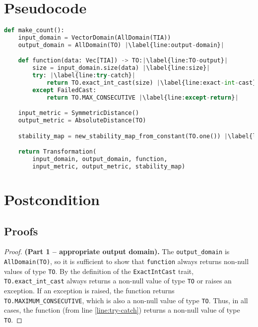 \documentclass{article}
\begin{document}
\section{Pseudocode}
\begin{lstlisting}[language = Python, escapechar=|]
def make_count():
    input_domain = VectorDomain(AllDomain(TIA))
    output_domain = AllDomain(TO) |\label{line:output-domain}|

    def function(data: Vec[TIA]) -> TO:|\label{line:TO-output}|
        size = input_domain.size(data) |\label{line:size}|
        try: |\label{line:try-catch}|
            return TO.exact_int_cast(size) |\label{line:exact-int-cast}|
        except FailedCast:
            return TO.MAX_CONSECUTIVE |\label{line:except-return}|

    input_metric = SymmetricDistance()
    output_metric = AbsoluteDistance(TO)

    stability_map = new_stability_map_from_constant(TO.one()) |\label{line:stability-map}|

    return Transformation(
        input_domain, output_domain, function,
        input_metric, output_metric, stability_map)
\end{lstlisting}

\section{Postcondition}

\subsection*{Proofs}

\begin{proof} \textbf{(Part 1 -- appropriate output domain).}
    The \texttt{output\_domain} is \texttt{AllDomain(TO)}, so it is sufficient to show that \texttt{function} always returns non-null values of type \texttt{TO}.
    By the definition of the \texttt{ExactIntCast} trait, \texttt{TO.exact\_int\_cast} always returns a non-null value of type \texttt{TO} or raises an exception.
    If an exception is raised, the function returns \texttt{TO.MAXIMUM\_CONSECUTIVE}, which is also a non-null value of type \texttt{TO}.
    Thus, in all cases, the function (from line \ref{line:try-catch}) returns a non-null value of type \texttt{TO}.
\end{proof}
\end{document}
